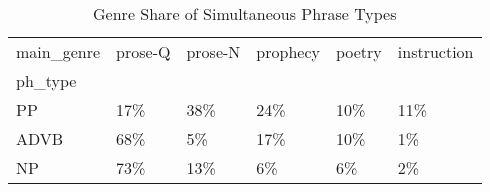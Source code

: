 \begin{table}[htbp!]
\centering
\caption{Genre Share of Simultaneous Phrase Types}
\label{table:simgenph_pc}
\begin{tabular}{llllll}
\toprule
main\_genre & prose-Q & prose-N & prophecy & poetry & instruction \\
ph\_type &         &         &          &        &             \\
\midrule
PP      &     17\% &     38\% &      24\% &    10\% &         11\% \\
ADVB    &     68\% &      5\% &      17\% &    10\% &          1\% \\
NP      &     73\% &     13\% &       6\% &     6\% &          2\% \\
\bottomrule
\end{tabular}
\end{table}
